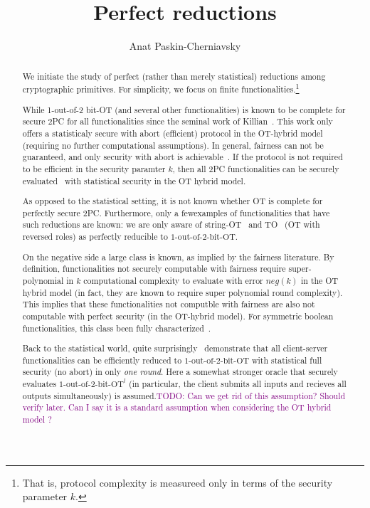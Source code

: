 \documentclass[a4paper]{article}
\title{Perfect reductions}
\author{Anat Paskin-Cherniavsky}
\newcommand{\OT}[2]{#1\text{-out-of-}#2\text{-bit-OT}}
\newcommand{\atodo}[1]{\textcolor{purple}{TODO: #1}}
\begin{document}
\maketitle

\begin{abstract}
We initiate the study of perfect (rather than merely statistical) reductions among cryptographic primitives. For simplicity, we focus on finite functionalities.\footnote{That is, protocol complexity is measureed only in terms of the security parameter $k$.}


While 1-out-of-2 bit-OT (and several other functionalities) is known to be complete for secure 2PC for all functionalities since the seminal work of Killian~\cite{Killian88}. This work only offers a statisticaly secure with abort (efficient) protocol in the OT-hybrid model (requiring no further computational assumptions). In general, fairness can not be guaranteed, and only security with abort is achievable~\cite{Cleve86}. If the protocol is not required to be efficient in the security paramter $k$, then all 2PC functionalities can be securely evaluated~\cite{GK10} with statistical security in the OT hybrid model.

As opposed to the statistical setting, it is not known whether OT is complete for perfectly secure 2PC. Furthermore, only a fewexamples of functionalities that have such reductions are known: we are only aware of string-OT~\cite{BCS96} and TO~\cite{WolfW06} (OT with reversed roles) as perfectly reducible to $\OT{1}{2}$.

On the negative side a large class is known, as implied by the fairness literature. By definition, functionalities not securely computable with fairness require super-polynomial in $k$ 
computational complexity to evaluate with error $neg(k)$ in the OT hybrid model (in fact, they are known to require super polynomial round complexity). 
This implies that these functionalities not computble with fairness are also not computable with perfect security (in the OT-hybrid model). For symmetric boolean functionalities, this class been fully characterized~\cite{}.

Back to the statistical world, quite surprisingly~\cite{IKOPS11} demonstrate that all client-server functionalities can be efficiently reduced to $\OT{1}{2}$ with statistical full security (no abort) in only \emph{one round}. Here a somewhat stronger oracle that securely evaluates ${\OT{1}{2}}^l$ (in particular, the client submits all inputs and recieves all outputs simultaneously) is assumed.\atodo{Can we get rid of this assumption? Should verify later. Can I say it is a standard assumption when considering the OT hybrid model ?}


\end{abstract}
\end{document}

